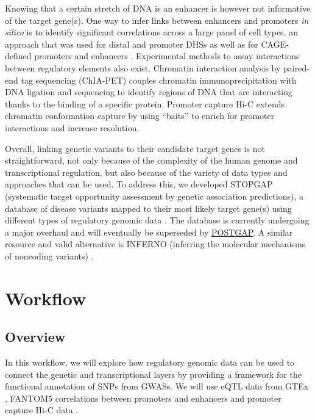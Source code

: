 \documentclass[9pt,a4paper,]{extarticle}
\begin{document}
Knowing that a certain stretch of DNA is an enhancer is however not informative of the target gene(s).
One way to infer links between enhancers and promoters \emph{in silico} is to identify significant correlations across a large panel of cell types, an approach that was used for distal and promoter DHSs \citep{Thurman2012} as well as for CAGE-defined promoters and enhancers \citep{Andersson2014}.
Experimental methods to assay interactions between regulatory elements also exist.
Chromatin interaction analysis by paired-end tag sequencing (ChIA-PET) \citep{Fullwood2009, Zhang2013} couples chromatin immunoprecipitation with DNA ligation and sequencing to identify regions of DNA that are interacting thanks to the binding of a specific protein.
Promoter capture Hi-C \citep{Mifsud2015, Javierre2016} extends chromatin conformation capture by using ``baits'' to enrich for promoter interactions and increase resolution.

Overall, linking genetic variants to their candidate target genes is not straightforward, not only because of the complexity of the human genome and transcriptional regulation, but also because of the variety of data types and approaches that can be used.
To address this, we developed STOPGAP (systematic target opportunity assessment by genetic association predictions), a database of disease variants mapped to their most likely target gene(s) using different types of regulatory genomic data \citep{Shen2017}.
The database is currently undergoing a major overhaul and will eventually be superseded by \href{https://github.com/Ensembl/postgap}{POSTGAP}.
A similar resource and valid alternative is INFERNO (inferring the molecular mechanisms of noncoding variants) \citep{Amlie-Wolf2017}.

\section{Workflow}\label{workflow}

\subsection{Overview}\label{overview}

In this workflow, we will explore how regulatory genomic data can be used to connect the genetic and transcriptional layers by providing a framework for the functional annotation of SNPs from GWASs.
We will use eQTL data from GTEx \citep{GTEx2017}, FANTOM5 correlations between promoters and enhancers \citep{Andersson2014} and promoter capture Hi-C data \citep{Javierre2016}.
\end{document}
